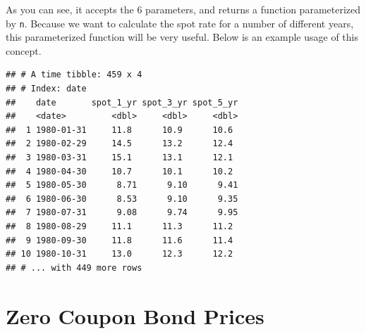 \documentclass[]{book}
\newenvironment{Shaded}{\begin{snugshade}}{\end{snugshade}}
\newcommand{\CommentTok}[1]{\textcolor[rgb]{0.56,0.35,0.01}{\textit{#1}}}
\newcommand{\DataTypeTok}[1]{\textcolor[rgb]{0.13,0.29,0.53}{#1}}
\newcommand{\DecValTok}[1]{\textcolor[rgb]{0.00,0.00,0.81}{#1}}
\newcommand{\KeywordTok}[1]{\textcolor[rgb]{0.13,0.29,0.53}{\textbf{#1}}}
\newcommand{\NormalTok}[1]{#1}
\newcommand{\OperatorTok}[1]{\textcolor[rgb]{0.81,0.36,0.00}{\textbf{#1}}}
\newcommand{\StringTok}[1]{\textcolor[rgb]{0.31,0.60,0.02}{#1}}
\theoremstyle{definition}
\theoremstyle{definition}
\theoremstyle{definition}
\theoremstyle{remark}
\begin{document}
As you can see, it accepts the 6 parameters, and returns a function
parameterized by \texttt{n}. Because we want to calculate the spot rate
for a number of different years, this parameterized function will be
very useful. Below is an example usage of this concept.

\begin{Shaded}
\end{Shaded}

\begin{verbatim}
## # A time tibble: 459 x 4
## # Index: date
##    date       spot_1_yr spot_3_yr spot_5_yr
##    <date>         <dbl>     <dbl>     <dbl>
##  1 1980-01-31     11.8      10.9      10.6 
##  2 1980-02-29     14.5      13.2      12.4 
##  3 1980-03-31     15.1      13.1      12.1 
##  4 1980-04-30     10.7      10.1      10.2 
##  5 1980-05-30      8.71      9.10      9.41
##  6 1980-06-30      8.53      9.10      9.35
##  7 1980-07-31      9.08      9.74      9.95
##  8 1980-08-29     11.1      11.3      11.2 
##  9 1980-09-30     11.8      11.6      11.4 
## 10 1980-10-31     13.0      12.3      12.2 
## # ... with 449 more rows
\end{verbatim}

\hypertarget{zero-coupon-bond-prices}{%
\section{Zero Coupon Bond Prices}\label{zero-coupon-bond-prices}}
\end{document}
